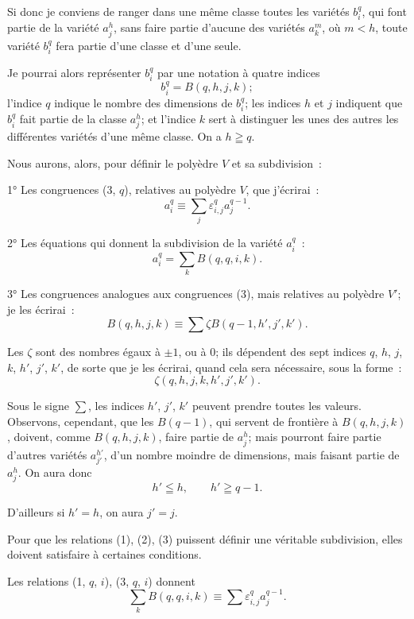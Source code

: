 \documentclass{article}
\begin{document}
Si donc je conviens de ranger dans une même classe toutes les variétés $b^{q}_{i}$, qui font partie de la variété $a^{h}_{j}$, sans faire partie d'aucune des variétés $a^{m}_{k}$, où $m < h$, toute variété $b^{q}_{i}$ fera partie d'une classe et d'une seule.

Je pourrai alors représenter $b^{q}_{i}$ par une notation à quatre indices
\[ b^{q}_{i} = B(q, h, j, k); \]
l'indice $q$ indique le nombre des dimensions de $b^{q}_{i}$; les indices $h$ et $j$ indiquent que $b^{q}_{i}$ fait partie de la classe $a^{h}_{j}$; et l'indice $k$ sert à distinguer les unes des autres les différentes variétés d'une même classe. On a $h \geqq q$.

Nous aurons, alors, pour définir le polyèdre $V$ et sa subdivision~:

1° Les congruences (3, $q$), relatives au polyèdre $V$, que j'écrirai~:
\[ a^{q}_{i} \equiv \sum_{j} \varepsilon^{q}_{i,j} a^{q-1}_{j}. \tag{3, $q$, $i$} \]

2° Les équations qui donnent la subdivision de la variété $a^{q}_{i}$~:
\[ a^{q}_{i} = \sum_{k} B(q, q, i, k). \tag{1, $q$, $i$} \]

3° Les congruences analogues aux congruences (3), mais relatives
au polyèdre $V'$; je les écrirai~:
\[ B(q, h, j, k) \equiv \sum \zeta B(q - 1, h', j', k'). \tag{2, $q$, $h$, $j$, $k$} \]

Les $\zeta$ sont des nombres égaux à $\pm 1$, ou à 0; ils dépendent des sept indices $q$, $h$, $j$, $k$, $h'$, $j'$, $k'$, de sorte que je les écrirai, quand cela sera nécessaire, sous la forme~:
\[ \zeta(q, h, j, k, h', j', k'). \]

Sous le signe $\displaystyle\sum$, les indices $h'$, $j'$, $k'$ peuvent prendre toutes les valeurs. Observons, cependant, que les $B(q - 1)$, qui servent de frontière à $B(q, h, j, k)$, doivent, comme $B(q, h, j, k)$, faire partie de $a^{h}_{j}$; mais pourront faire partie d'autres variétés $a^{h'}_{j'}$, d'un nombre moindre de dimensions, mais faisant partie de $a^{h}_{j}$. On aura donc
\[ h' \leqq h, \qquad h' \geqq q - 1. \]

D'ailleurs si $h' = h$, on aura $j' = j$.

Pour que les relations (1), (2), (3) puissent définir une véritable subdivision, elles doivent satisfaire à certaines conditions.

Les relations (1, $q$, $i$), (3, $q$, $i$) donnent
\[ \sum_{k} B(q, q, i, k) \equiv \sum \varepsilon^{q}_{i,j} a^{q-1}_{j}. \tag{$\alpha$} \]
\end{document}
